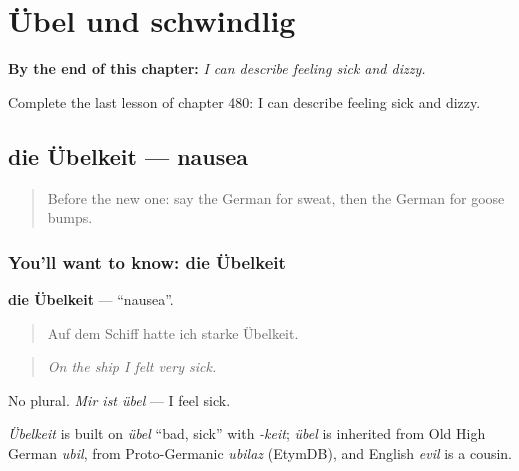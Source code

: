 
\chapter{Übel und schwindlig}
\label{ch:ge-ubel-und-schwindlig}

\begin{chapteropening}
\textbf{By the end of this chapter:} \emph{I can describe feeling sick and dizzy.}

Complete the last lesson of chapter 480: I can describe feeling sick and dizzy.
\end{chapteropening}

\section[die Übelkeit]{die Übelkeit — nausea}

\label{lesson:GE-C480-uebelkeit}



\begin{quote}
Before the new one: say the German for sweat, then the German for goose bumps.
\end{quote}

\subsection*{You'll want to know: die Übelkeit}
\textbf{die Übelkeit} — \textquotedblleft{}nausea\textquotedblright{}.

\begin{quote}
Auf dem Schiff hatte ich starke Übelkeit.
\end{quote}

\begin{quote}
\emph{On the ship I felt very sick.}
\end{quote}

No plural. \emph{Mir ist übel} — I feel sick.

\begin{cousinweb}
\emph{Übelkeit} is built on \emph{übel} \textquotedblleft{}bad, sick\textquotedblright{} with \emph{-keit}; \emph{übel} is inherited from Old High German \emph{ubil}, from Proto-Germanic \emph{ubilaz} (EtymDB), and English \emph{evil} is a cousin.
\end{cousinweb}


